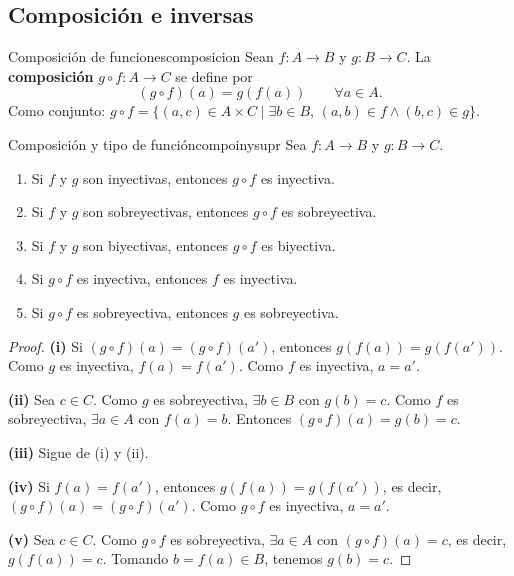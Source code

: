 \subsection{Composición e inversas}

\begin{definicion}{Composición de funciones}{composicion}
Sean $f: A \to B$ y $g: B \to C$. La \textbf{composición} $g \circ f: A \to C$ se define por
\[
  (g \circ f)(a) = g(f(a)) \qquad \forall a \in A.
\]
Como conjunto: $g \circ f = \{(a, c) \in A \times C \mid \exists b \in B,\, (a,b) \in f \wedge (b,c) \in g\}$.
\end{definicion}

\begin{proposicion}{Composición y tipo de función}{compoinysupr}
Sea $f: A \to B$ y $g: B \to C$.
\begin{enumerate}[leftmargin=2em, label=(\roman*)]
  \item Si $f$ y $g$ son inyectivas, entonces $g \circ f$ es inyectiva.
  \item Si $f$ y $g$ son sobreyectivas, entonces $g \circ f$ es sobreyectiva.
  \item Si $f$ y $g$ son biyectivas, entonces $g \circ f$ es biyectiva.
  \item Si $g \circ f$ es inyectiva, entonces $f$ es inyectiva.
  \item Si $g \circ f$ es sobreyectiva, entonces $g$ es sobreyectiva.
\end{enumerate}
\end{proposicion}

\begin{proof}
\textbf{(i)} Si $(g \circ f)(a) = (g \circ f)(a')$, entonces $g(f(a)) = g(f(a'))$. Como $g$ es inyectiva, $f(a) = f(a')$. Como $f$ es inyectiva, $a = a'$.

\textbf{(ii)} Sea $c \in C$. Como $g$ es sobreyectiva, $\exists b \in B$ con $g(b) = c$. Como $f$ es sobreyectiva, $\exists a \in A$ con $f(a) = b$. Entonces $(g \circ f)(a) = g(b) = c$.

\textbf{(iii)} Sigue de (i) y (ii).

\textbf{(iv)} Si $f(a) = f(a')$, entonces $g(f(a)) = g(f(a'))$, es decir, $(g \circ f)(a) = (g \circ f)(a')$. Como $g \circ f$ es inyectiva, $a = a'$.

\textbf{(v)} Sea $c \in C$. Como $g \circ f$ es sobreyectiva, $\exists a \in A$ con $(g \circ f)(a) = c$, es decir, $g(f(a)) = c$. Tomando $b = f(a) \in B$, tenemos $g(b) = c$.
\end{proof}

